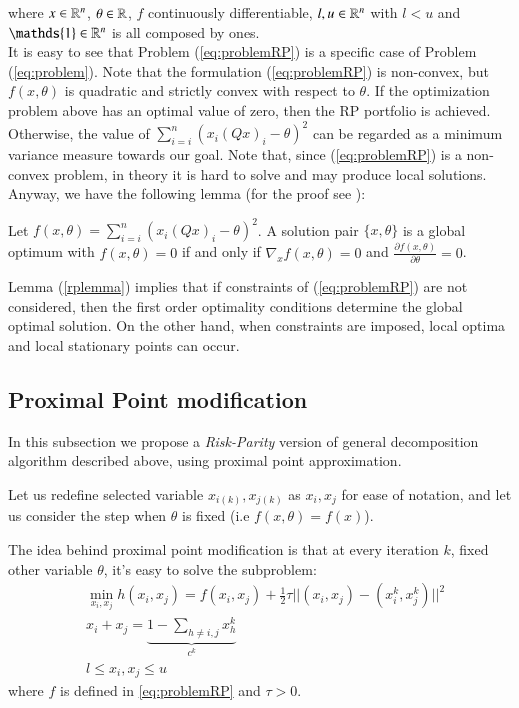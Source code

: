 where $x \in \mathbb{R}^n$, $\theta \in \mathbb{R}$, $f$ continuously differentiable, $l, u \in \mathbb{R}^n$ with $l < u$ and $\mathds{1} \in \R^n$ is all composed by ones. \\
It is easy to see that Problem (\ref{eq:problemRP}) is a specific case of Problem (\ref{eq:problem}). Note that the formulation (\ref{eq:problemRP}) is non-convex, but $f(x,\theta)$ is quadratic and strictly convex with respect to $\theta$.  If the optimization problem above has an optimal value of zero, then the RP portfolio is achieved. Otherwise, the value of $\sum_{i=i}^n \left( x_i(Q x)_i - \theta\right)^2$  can be regarded as a minimum variance measure towards our goal. Note that, since (\ref{eq:problemRP}) is a non-convex problem, in theory it is hard to solve and may produce local solutions. Anyway, we have the following lemma (for the proof see \cite{tutuncu}):
\begin{lemma}\label{rplemma}
Let $f(x,\theta) = \sum_{i=i}^n \left( x_i(Q x)_i - \theta\right)^2$. A solution pair $\{x,\theta\}$ is a global optimum with $f(x,\theta)=0$ if and only if $\nabla_xf(x,\theta) = 0$ and $\frac{\partial f(x,\theta)}{\partial \theta} = 0$.
\end{lemma}
Lemma (\ref{rplemma}) implies that if constraints of (\ref{eq:problemRP}) are not considered, then the first order optimality conditions determine the global optimal solution. On the other hand, when constraints are imposed, local optima and local stationary points can occur.
\subsection{Proximal Point modification}
In this subsection we propose a \emph{Risk-Parity} version of general decomposition algorithm described above, using proximal point approximation.

Let us redefine selected variable $x_{i(k)},x_{j(k)}$ as $x_{i},x_{j}$ for ease of notation, and let us consider the step when $\theta$ is fixed (i.e $f(x,\theta)=f(x)$).

The idea behind proximal point modification is that at every iteration $k$, fixed other variable $\theta$, it's easy to solve the subproblem:
\begin{align}
 &\min_{x_i,x_j}h(x_i,x_j)= f(x_i,x_j)+ \frac{1}{2} \tau||(x_i,x_j)-(x_i^k,x_j^k)||^2\\
 &x_i+x_j = \underbrace{1-\sum_{h \ne i,j} x^k_h}_{c^k}\\
 &l \le x_i,x_j\le u
 \end{align}
where $f$ is defined in \ref{eq:problemRP} and $\tau>0$.

